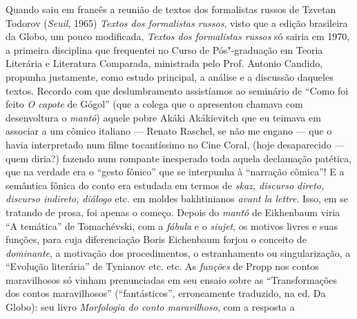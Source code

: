 Quando saiu em francês a reunião de textos dos formalistas russos de
Tzvetan Todorov (\emph{Seuil}, 1965) \emph{Textos dos formalistas
russos}, visto que a edição brasileira da Globo, um pouco modificada,
\emph{Textos dos formalistas russos} só sairia em 1970, a primeira
disciplina que frequentei no Curso de Pós"-graduação em Teoria Literária
e Literatura Comparada, ministrada pelo Prof. Antonio Candido, propunha
justamente, como estudo principal, a análise e a discussão daqueles
textos. Recordo com que deslumbramento assistíamos ao seminário de
``Como foi feito \emph{O capote} de Gógol'' (que a colega que o
apresentou chamava com desenvoltura o \emph{mantô}) aquele pobre Akáki
Akákievitch que eu teimava em associar a um cômico italiano --- Renato
Raschel, se não me engano --- que o havia interpretado num filme
tocantíssimo no Cine Coral, (hoje desaparecido --- quem diria?) fazendo num rompante inesperado toda aquela declamação patética, que na
verdade era o ``gesto fônico'' que se interpunha à ``narração cômica''!
E a semântica fônica do conto era estudada em termos de \emph{skaz,
discurso direto, discurso indireto, diálogo} etc. em moldes bakhtinianos
\emph{avant la lettre}. Isso, em se tratando de prosa, foi apenas o começo.
Depois do \emph{mantô} de Eikhenbaum viria ``A temática'' de
Tomachévski, com a \emph{fábula} e o \emph{siujet}, os motivos livres e
suas funções, para cuja diferenciação Boris Eichenbaum forjou o conceito
de \emph{dominante}, a motivação dos procedimentos, o estranhamento ou
singularização, a ``Evolução literária'' de Tynianov etc. etc. As
\emph{funções} de Propp nos contos maravilhosos só vinham prenunciadas
em seu ensaio sobre as ``Transformações dos contos maravilhosos''
(``fantásticos'', erroneamente traduzido, na ed. Da Globo): seu livro
\emph{Morfologia do conto maravilhoso}, com a resposta a
